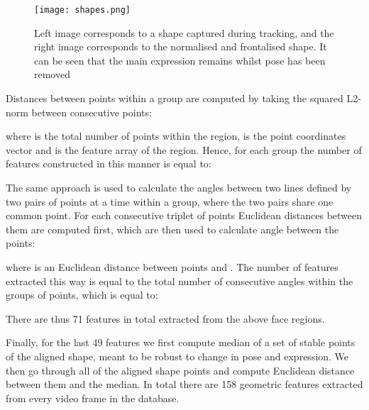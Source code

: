 \documentclass[a4paper, 10pt, conference]{ieeeconf}      \usepackage{FG2017}
\begin{document}
\begin{figure}[h!]
	\vspace{-10pt}
	\begin{center}
		\texttt{[image: shapes.png]}
	\end{center}
	\vspace{-20pt}
	\caption{Left image corresponds to a shape captured during tracking, and the right image corresponds to the normalised and frontalised shape. It can be seen that the main expression remains whilst pose has been removed}
	\label{fig:shapes}
\end{figure}

Distances between points within a group are computed by taking the squared L2-norm between consecutive points:


where  is the total number of points within the region,  is the point coordinates vector and  is the feature array of the region. Hence, for each group the number of features constructed in this manner  is equal to:




The same approach is used to calculate the angles between two lines defined by two pairs of points at a time within a group, where the two pairs share one common point. For each consecutive triplet of points Euclidean distances between them are computed first, which are then used to calculate angle between the points: 

where  is an Euclidean distance between points  and . The number of features extracted this way is equal to the total number of consecutive angles within the groups of points, which is equal to:

There are thus 71 features in total extracted from the above face regions. 

Finally, for the last 49 features we first compute median of a set of stable points of the aligned shape, meant to be robust to change in pose and expression. We then go through all of the aligned shape points and compute Euclidean distance between them and the median. In total there are 158 geometric features extracted from every video frame in the database. 
\end{document}
